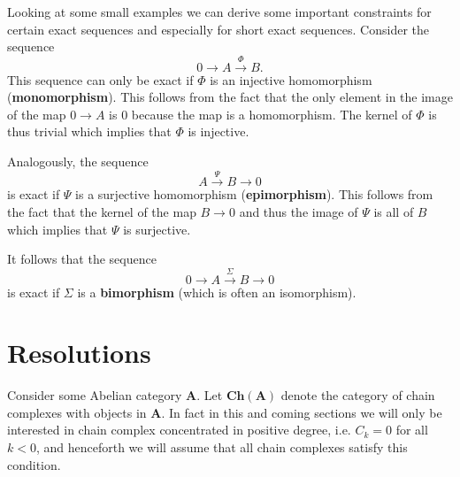 
	\begin{property}
		Looking at some small examples we can derive some important constraints for certain exact sequences and especially for short exact sequences. Consider the sequence \[0\rightarrow A\xrightarrow{\Phi} B.\] This sequence can only be exact if $\Phi$ is an injective homomorphism (\textbf{monomorphism}). This follows from the fact that the only element in the image of the map $0\rightarrow A$ is 0 because the map is a homomorphism. The kernel of $\Phi$ is thus trivial which implies that $\Phi$ is injective.

		Analogously, the sequence \[A\xrightarrow{\Psi}B\rightarrow0\] is exact if $\Psi$ is a surjective homomorphism (\textbf{epimorphism}). This follows from the fact that the kernel of the map $B\rightarrow0$ and thus the image of $\Psi$ is all of $B$ which implies that $\Psi$ is surjective.

		It follows that the sequence \[0\rightarrow A\xrightarrow{\Sigma}B\rightarrow0\] is exact if $\Sigma$ is a \textbf{bimorphism} (which is often an isomorphism).
	\end{property}

\section{Resolutions}

	Consider some Abelian category $\textbf{A}$. Let $\textbf{Ch}(\textbf{A})$ denote the category of chain complexes with objects in $\textbf{A}$. In fact in this and coming sections we will only be interested in chain complex concentrated in positive degree, i.e. $C_k=0$ for all $k<0$, and henceforth we will assume that all chain complexes satisfy this condition.


